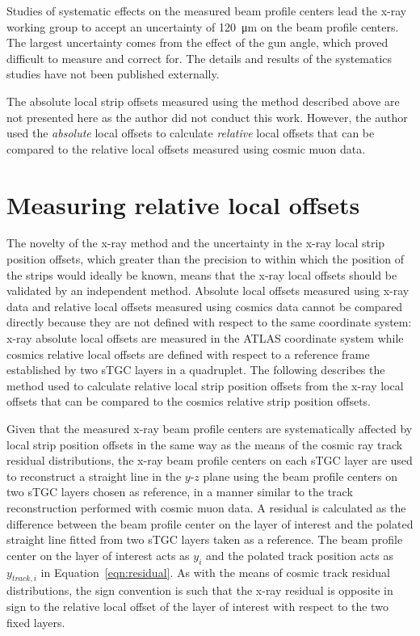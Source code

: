 Studies of systematic effects on the measured beam profile centers lead the x-ray working group to accept an uncertainty of \SI{120}{\micro\meter} on the beam profile centers. The largest uncertainty comes from the effect of the gun angle, which proved difficult to measure and correct for. The details and results of the systematics studies have not been published externally. 

The absolute local strip offsets measured using the method described above are not presented here as the author did not conduct this work. However, the author used the {\em absolute} local offsets to calculate {\em relative} local offsets that can be compared to the relative local offsets measured using cosmic muon data.

\section{Measuring relative local offsets}

The novelty of the x-ray method and the uncertainty in the x-ray local strip position offsets, which greater than the precision to within which the position of the strips would ideally be known, means that the x-ray local offsets should be validated by an independent method. Absolute local offsets measured using x-ray data and relative local offsets measured using cosmics data cannot be compared directly because they are not defined with respect to the same coordinate system: x-ray absolute local offsets are measured in the ATLAS coordinate system while cosmics relative local offsets are defined with respect to a reference frame established by two sTGC layers in a quadruplet. The following describes the method used to calculate relative local strip position offsets from the x-ray local offsets that can be compared to the cosmics relative strip position offsets.

Given that the measured x-ray beam profile centers are systematically affected by local strip position offsets in the same way as the means of the cosmic ray track residual distributions, the x-ray beam profile centers on each sTGC layer are used to reconstruct a straight line in the $y$-$z$ plane using the beam profile centers on two sTGC layers chosen as reference, in a manner similar to the track reconstruction performed with cosmic muon data. A residual is calculated as the difference between the beam profile center on the layer of interest and the polated straight line fitted from two sTGC layers taken as a reference. The beam profile center on the layer of interest acts as $y_{i}$ and the polated track position acts as $y_{track, i}$ in Equation~\ref{eqn:residual}.  As with the means of cosmic track residual distributions, the sign convention is such that the x-ray residual is opposite in sign to the relative local offset of the layer of interest with respect to the two fixed layers. 

